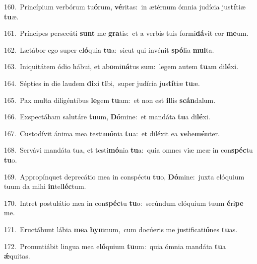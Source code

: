 {\numbfont\textcolor{\numbcolor}{160.}}~Princípium verbórum tu\-\textbf{ó}\-rum, \textbf{vé}\-ritas:~\star in ætérnum ómnia judícia jus\-\textbf{tí}\-tiæ \textbf{tu}\-æ.\par
{\numbfont\textcolor{\numbcolor}{161.}}~Príncipes persecúti \textbf{sunt} me \textbf{gra}\-tis:~\star et a verbis tuis formi\-\textbf{dá}\-vit cor \textbf{me}\-um.\par
{\numbfont\textcolor{\numbcolor}{162.}}~Lætábor ego super e\-\textbf{ló}\-quia \textbf{tu}\-a:~\star sicut qui invénit \textbf{spó}\-lia \textbf{mul}\-ta.\par
{\numbfont\textcolor{\numbcolor}{163.}}~Iniquitátem ódio hábui, et ab\-\textbf{o}\-mi\-\textbf{ná}\-tus sum:~\star legem autem \textbf{tu}\-am di\-\textbf{lé}\-xi.\par
{\numbfont\textcolor{\numbcolor}{164.}}~Sépties in die laudem \textbf{di}\-xi \textbf{ti}\-bi,~\star super judícia jus\-\textbf{tí}\-tiæ \textbf{tu}\-æ.\par
{\numbfont\textcolor{\numbcolor}{165.}}~Pax multa diligéntibus \textbf{le}\-gem \textbf{tu}\-am:~\star et non est \textbf{il}\-lis \textbf{scán}\-dalum.\par
{\numbfont\textcolor{\numbcolor}{166.}}~Exspectábam salutáre \textbf{tu}\-um, \textbf{Dó}\-mine:~\star et mandáta \textbf{tu}\-a di\-\textbf{lé}\-xi.\par
{\numbfont\textcolor{\numbcolor}{167.}}~Custodívit ánima mea testi\-\textbf{mó}\-nia \textbf{tu}\-a:~\star et diléxit ea \textbf{ve}\-he\-\textbf{mén}\-ter.\par
{\numbfont\textcolor{\numbcolor}{168.}}~Servávi mandáta tua, et testi\-\textbf{mó}\-nia \textbf{tu}\-a:~\star quia omnes viæ meæ in con\-\textbf{spéc}\-tu \textbf{tu}\-o.\par
{\numbfont\textcolor{\numbcolor}{169.}}~Appropínquet deprecátio mea in conspéctu \textbf{tu}\-o, \textbf{Dó}\-mine:~\star juxta elóquium tuum da mihi \textbf{in}\-tel\-\textbf{léc}\-tum.\par
{\numbfont\textcolor{\numbcolor}{170.}}~Intret postulátio mea in con\-\textbf{spéc}\-tu \textbf{tu}\-o:~\star secúndum elóquium tuum \textbf{é}\-ri\textbf{pe} me.\par
{\numbfont\textcolor{\numbcolor}{171.}}~Eructábunt lábia \textbf{me}\-a \textbf{hym}\-num,~\star cum docúeris me justificati\-\textbf{ó}\-nes \textbf{tu}\-as.\par
{\numbfont\textcolor{\numbcolor}{172.}}~Pronuntiábit lingua mea e\-\textbf{ló}\-quium \textbf{tu}\-um:~\star quia ómnia mandáta \textbf{tu}\-a \textbf{ǽ}\-quitas.\par
